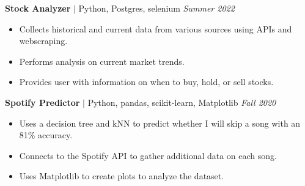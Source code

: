 \documentclass[11pt, a4paper, roman]{moderncv}
\newcommand{\project}[5]{
	\textbf{#1}
	$|$ #3 
	\hfill\textit{#4}
	#5
	\vspace{2mm}
}
\begin{document}
{\project{Stock Analyzer}{}{Python, Postgres, selenium}{Summer 2022}
	{\begin{itemize}
		\item Collects historical and current data from various sources using APIs and webscraping.
		\item Performs analysis on current market trends.
		\item Provides user with information on when to buy, hold, or sell stocks.
	\end{itemize}}

{\project{Spotify Predictor}{https://github.com/GoneSahlin/CPSC222Final}{Python, pandas, scikit-learn, Matplotlib}{Fall 2020}
	{\begin{itemize}
    		\item Uses a decision tree and kNN to predict whether I will skip a song with an 81\% accuracy.
    		\item Connects to the Spotify API to gather additional data on each song.
   		 \item Uses Matplotlib to create plots to analyze the dataset.
	\end{itemize}}
}



}
\end{document}
